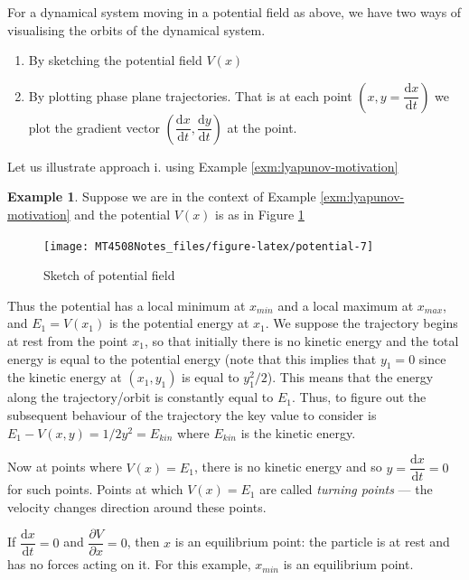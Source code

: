 \documentclass[
  a4paper,
  oneside,
  final]{krantz}
\providecommand{\tightlist}{%
  \setlength{\itemsep}{0pt}\setlength{\parskip}{0pt}}
\renewcommand{\d}{\mathrm{d}}
\newcommand{\pder}[2]{\dfrac{\partial #1}{\partial#2}}
\newcommand{\der}[2]{\dfrac{\d #1}{\d #2}}
\theoremstyle{definition}
\theoremstyle{definition}
\newtheorem{example}{Example}[chapter]
\theoremstyle{definition}
\theoremstyle{definition}
\theoremstyle{remark}
\begin{document}
For a dynamical system moving in a potential field as above, we have two ways of visualising the orbits of the dynamical system.

\begin{enumerate}
\def\labelenumi{\roman{enumi}.}
\tightlist
\item
  By sketching the potential field \(V(x)\)
\item
  By plotting phase plane trajectories. That is at each point \(\left(x, y = \der{x}{t}\right)\) we plot the gradient vector \(\left( \der{x}{t}, \der{y}{t}\right)\) at the point.
\end{enumerate}

Let us illustrate approach i. using Example \ref{exm:lyapunov-motivation}

\begin{example}
\protect\hypertarget{exm:lyapunov-motivation-II}{}\label{exm:lyapunov-motivation-II}Suppose we are in the context of Example \ref{exm:lyapunov-motivation} and the potential \(V(x)\) is as in Figure \ref{fig:potential}

\begin{figure}

{\centering \texttt{[image: MT4508Notes\_files/figure-latex/potential-7]} 

}

\caption{Sketch of potential field}\label{fig:potential}
\end{figure}

Thus the potential has a local minimum at \(x_{min}\) and a local maximum at \(x_{max}\), and \(E_1 = V(x_1)\) is the potential energy at \(x_1\). We suppose the trajectory begins at rest from the point \(x_{1}\), so that initially there is no kinetic energy and the total energy is equal to the potential energy (note that this implies that \(y_1 = 0\) since the kinetic energy at \((x_1,y_1)\) is equal to \(y_1^2/2\)). This means that the energy along the trajectory/orbit is constantly equal to \(E_1\). Thus, to figure out the subsequent behaviour of the trajectory the key value to consider is \(E_1 - V(x,y) = 1/2 y^2 = E_{kin}\) where \(E_{kin}\) is the kinetic energy.

Now at points where \(V(x) = E_1\), there is no kinetic energy and so \(y = \der{x}{t} =0\) for such points. Points at which \(V(x) = E_1\) are called \emph{turning points} --- the velocity changes direction around these points.

If \(\der{x}{t} = 0\) and \(\pder{V}{x} =0\), then \(x\) is an equilibrium point: the particle is at rest and has no forces acting on it. For this example, \(x_{min}\) is an equilibrium point.


\end{example}
\end{document}
